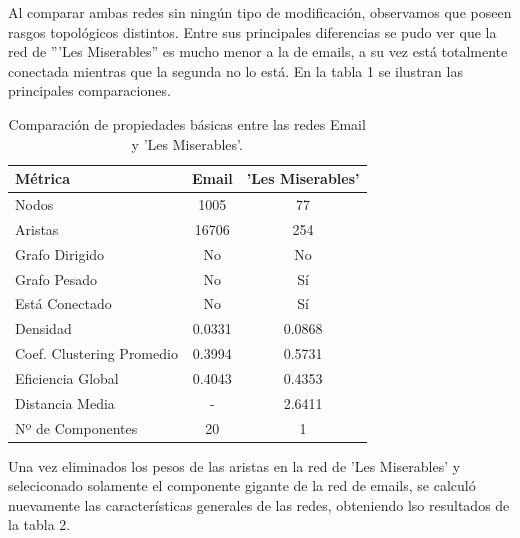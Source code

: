 \documentclass[conference]{IEEEtran}
\begin{document}
Al comparar ambas redes sin ningún tipo de modificación, observamos que poseen rasgos topológicos distintos. Entre sus principales diferencias se pudo ver que la red de '''Les Miserables'' es mucho menor a la de emails, a su vez está totalmente conectada mientras que la segunda no lo está. En la tabla 1 se ilustran las principales comparaciones.

\begin{table}[h]
\centering
\begin{tabular}{|l|c|c|}
\hline
\textbf{Métrica} & \textbf{Email} & \textbf{'Les Miserables'} \\
\hline
Nodos & 1005 & 77 \\
\hline
Aristas & 16706 & 254 \\
\hline
Grafo Dirigido & No & No \\
\hline
Grafo Pesado & No & Sí \\
\hline
Está Conectado & No & Sí \\
\hline
Densidad & 0.0331 & 0.0868 \\
\hline
Coef. Clustering Promedio & 0.3994 & 0.5731 \\
\hline
Eficiencia Global & 0.4043 & 0.4353 \\
\hline
Distancia Media & - & 2.6411 \\
\hline
Nº de Componentes & 20 & 1 \\
\hline
\end{tabular}
\vspace{5pt}
\caption{Comparación de propiedades básicas entre las redes Email y 'Les Miserables'.}
\label{tab:comparacion_redes}
\end{table}
\FloatBarrier
Una vez eliminados los pesos de las aristas en la red de 'Les Miserables' y seleciconado solamente el componente gigante de la red de emails, se calculó nuevamente las características generales de las redes, obteniendo lso resultados de la tabla 2.
\vspace{5pt}
\end{document}
